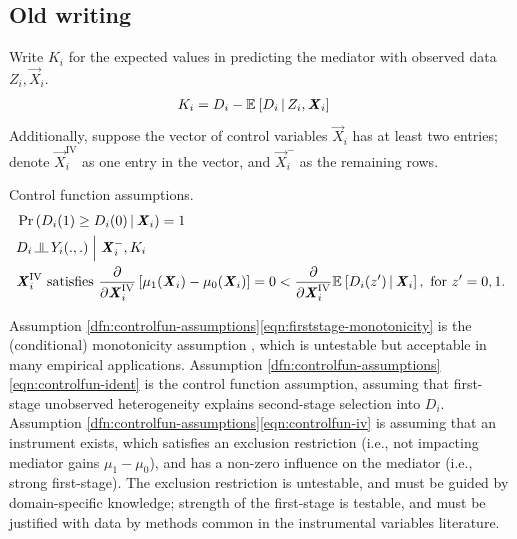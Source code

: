 \subsection{Old writing}
Write $K_i$ for the expected values in predicting the mediator with observed data $Z_i, \vec X_i$.
\begin{align*}
    K_i &= D_i - \mathbb{E}_{} \left[ D_i \, \middle\vert \, Z_i, \boldsymbol{\mathit{X}}_i \right]
\end{align*}
Additionally, suppose the vector of control variables $\vec X_i$ has at least two entries;
denote $\vec X_i^{\text{IV}}$ as one entry in the vector, and $\vec X_i^-$ as the remaining rows.
\begin{definition}
    \label{dfn:controlfun-assumptions}
    Control function assumptions.
    \begin{align}
        \label{eqn:firststage-monotonicity}
        &\Probgiven{ D_i(1) \geq D_i(0) }{\vec X_i} = 1 \\
        \label{eqn:controlfun-ident}
        &D_i \indep Y_i(.,.) \; \Big| \; \vec X_i^-, K_i \\
        \label{eqn:controlfun-iv}
        &\vec X_i^{\text{IV}} \textnormal{ satisfies }
        \partialdiff{\vec X_i^{\text{IV}}}\left[
            \mu_1(\vec X_i) - \mu_0(\vec X_i)\right] = 0
            < \partialdiff{\vec X_i^{\text{IV}}}\Egiven{D_i(z')}{\vec X_i},
            \textnormal{ for } z' = 0, 1.
    \end{align}
\end{definition}
Assumption \ref{dfn:controlfun-assumptions}\eqref{eqn:firststage-monotonicity} is the (conditional) monotonicity assumption \citep{imbens1994identification}, which is untestable but acceptable in many empirical applications.
Assumption \ref{dfn:controlfun-assumptions}\eqref{eqn:controlfun-ident} is the control function assumption, assuming that first-stage unobserved heterogeneity explains second-stage selection into $D_i$.
Assumption \ref{dfn:controlfun-assumptions}\eqref{eqn:controlfun-iv} is assuming that an instrument exists, which satisfies an exclusion restriction (i.e., not impacting mediator gains $\mu_1-\mu_0$), and has a non-zero influence on the mediator (i.e., strong first-stage).
The exclusion restriction is untestable, and must be guided by domain-specific knowledge; strength of the first-stage is testable, and must be justified with data by methods common in the instrumental variables literature.

